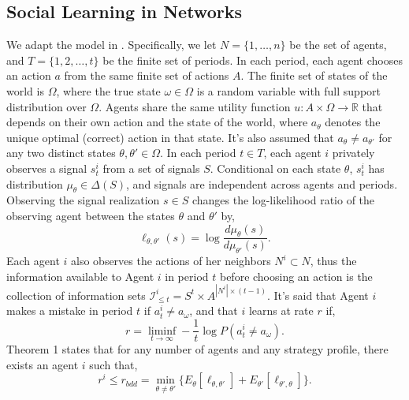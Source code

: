 \subsection*{Social Learning in Networks}

We adapt the model in \cite{brandl2024}. Specifically, we let $N = \{1, \ldots, n\}$ be the set of agents, and $T = \{1, 2, \ldots, t \}$ be the finite set of periods. In each period, each agent chooses an action $a$ from the same finite set of actions $A$. The finite set of states of the world is $\Omega$, where the true state $\omega \in \Omega$ is a random variable with full support distribution over $\Omega$. Agents share the same utility function $u : A \times \Omega \to \mathbb{R}$ that depends on their own action and the state of the world, where $a_\theta$ denotes the unique optimal (correct) action in that state. It's also assumed that $a_\theta \neq a_{\theta'}$ for any two distinct states $\theta, \theta' \in \Omega$. In each period $t \in T$, each agent $i$ privately observes a signal $s_t^i$ from a set of signals $S$. Conditional on each state $\theta$, $s_t^i$ has distribution $\mu_\theta \in \Delta(S)$, and signals are independent across agents and periods. Observing the signal realization $s \in S$ changes the log-likelihood ratio of the observing agent between the states $\theta$ and $\theta'$ by,
\[
\ell_{\theta, \theta'}(s) = \log \frac{d\mu_\theta(s)}{d\mu_{\theta'}(s)}.
\]
Each agent $i$ also observes the actions of her neighbors $N^i \subset N$, thus the information available to Agent $i$ in period $t$ before choosing an action is the collection of information sets $\mathcal{I}^i_{\leq t} = S^t \times A^{|N^i| \times (t-1)}$. It's said that Agent $i$ makes a mistake in period $t$ if $a_t^i \neq a_\omega$, and that $i$ learns at rate $r$ if,
\[
r = \liminf_{t \to \infty} -\frac{1}{t} \log P(a_t^i \neq a_\omega).
\]
Theorem 1 states that for any number of agents and any strategy profile, there exists an agent $i$ such that,
\[r^i \leq r_{bdd} = \min_{\theta \neq \theta'}\{E_\theta[\ell_{\theta,\theta'}] + E_{\theta'}[\ell_{\theta',\theta}]\}.\]


